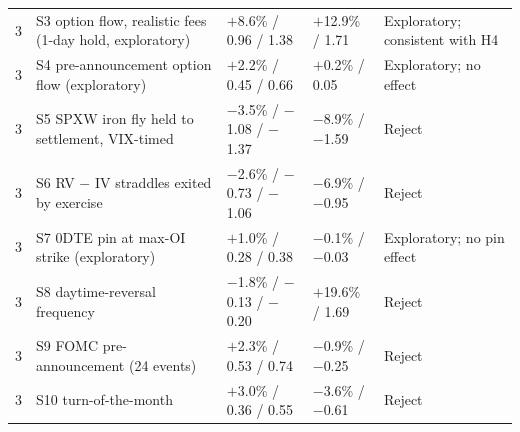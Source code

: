 {\begin{longtable}{@{}c >{\raggedright\arraybackslash}p{4.6cm} >{\raggedright\arraybackslash}p{3.1cm} >{\raggedright\arraybackslash}p{3.2cm} >{\raggedright\arraybackslash}p{3.1cm}@{}}
3 & S3 option flow, realistic fees (1-day hold, exploratory) & $+$8.6\% / 0.96 / 1.38 & $+$12.9\% / 1.71 & Exploratory; consistent with H4 \\
3 & S4 pre-announcement option flow (exploratory) & $+$2.2\% / 0.45 / 0.66 & $+$0.2\% / 0.05 & Exploratory; no effect \\
3 & S5 SPXW iron fly held to settlement, VIX-timed & $-$3.5\% / $-$1.08 / $-$1.37 & $-$8.9\% / $-$1.59 & Reject \\
3 & S6 RV $-$ IV straddles exited by exercise & $-$2.6\% / $-$0.73 / $-$1.06 & $-$6.9\% / $-$0.95 & Reject \\
3 & S7 0DTE pin at max-OI strike (exploratory) & $+$1.0\% / 0.28 / 0.38 & $-$0.1\% / $-$0.03 & Exploratory; no pin effect \\
3 & S8 daytime-reversal frequency & $-$1.8\% / $-$0.13 / $-$0.20 & $+$19.6\% / 1.69 & Reject \\
3 & S9 FOMC pre-announcement (24 events) & $+$2.3\% / 0.53 / 0.74 & $-$0.9\% / $-$0.25 & Reject \\
3 & S10 turn-of-the-month & $+$3.0\% / 0.36 / 0.55 & $-$3.6\% / $-$0.61 & Reject \\
\end{longtable}}
